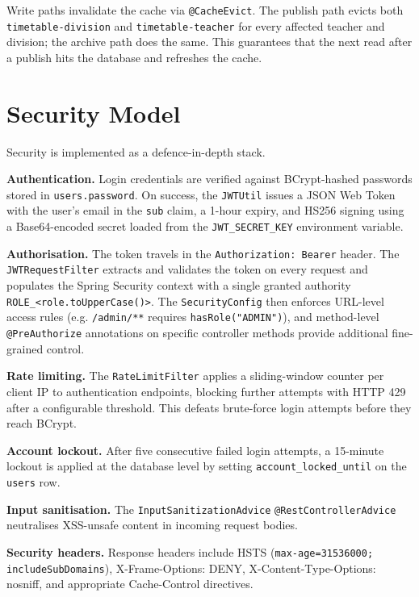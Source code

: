Write paths invalidate the cache via \texttt{@CacheEvict}. The publish path evicts both \texttt{timetable-division} and \texttt{timetable-teacher} for every affected teacher and division; the archive path does the same. This guarantees that the next read after a publish hits the database and refreshes the cache.

\section{Security Model}

Security is implemented as a defence-in-depth stack.

\textbf{Authentication.} Login credentials are verified against BCrypt-hashed passwords stored in \texttt{users.password}. On success, the \texttt{JWTUtil} issues a JSON Web Token with the user's email in the \texttt{sub} claim, a 1-hour expiry, and HS256 signing using a Base64-encoded secret loaded from the \texttt{JWT\_SECRET\_KEY} environment variable.

\textbf{Authorisation.} The token travels in the \texttt{Authorization: Bearer} header. The \texttt{JWTRequestFilter} extracts and validates the token on every request and populates the Spring Security context with a single granted authority \texttt{ROLE\_<role.toUpperCase()>}. The \texttt{SecurityConfig} then enforces URL-level access rules (e.g. \texttt{/admin/**} requires \texttt{hasRole("ADMIN")}), and method-level \texttt{@PreAuthorize} annotations on specific controller methods provide additional fine-grained control.

\textbf{Rate limiting.} The \texttt{RateLimitFilter} applies a sliding-window counter per client IP to authentication endpoints, blocking further attempts with HTTP 429 after a configurable threshold. This defeats brute-force login attempts before they reach BCrypt.

\textbf{Account lockout.} After five consecutive failed login attempts, a 15-minute lockout is applied at the database level by setting \texttt{account\_locked\_until} on the \texttt{users} row.

\textbf{Input sanitisation.} The \texttt{InputSanitizationAdvice} \texttt{@RestControllerAdvice} neutralises XSS-unsafe content in incoming request bodies.

\textbf{Security headers.} Response headers include HSTS (\texttt{max-age=31536000; includeSubDomains}), X-Frame-Options: DENY, X-Content-Type-Options: nosniff, and appropriate Cache-Control directives.

